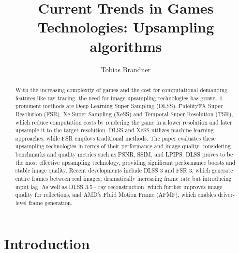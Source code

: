 \documentclass[letterpaper, 10 pt, conference]{ieeeconf}  %
\title{\LARGE \bf
Current Trends in Games Technologies: Upsampling algorithms
}
\author{Tobias Brandner}
\affil{Julius-Maximilians University \\
        Würzburg, Germany \\
        tobias.brandner@stud-mail.uni-wuerzburg.de}
\begin{document}
\maketitle
\thispagestyle{empty}
\pagestyle{empty}

\BiblatexSplitbibDefernumbersWarningOff

\begin{abstract}

With the increasing complexity of games and the cost for computational demanding features like ray tracing, the need for image upsampling technologies has grown. 
4 prominent methods are Deep Learning Super Sampling (DLSS), FidelityFX Super Resolution (FSR), Xe Super Sampling (XeSS) and Temporal Super Resolution (TSR), which reduce computation costs by rendering the game in a lower resolution and later upsample it to the target resolution. 
DLSS and XeSS utilizes machine learning approaches, while FSR employs traditional methods. 
The paper evaluates these upsampling technologies in terms of their performance and image quality, considering benchmarks and quality metrics such as PSNR, SSIM, and LPIPS. 
DLSS proves to be the most effective upsampling technology, providing significant performance boosts and stable image quality. 
Recent developments include DLSS 3 and FSR 3, which generate entire frames between real images, dramatically increasing frame rate but introducing input lag.
As well as DLSS 3.5 - ray reconstruction, which further improves image quality for reflections, and AMD's Fluid Motion Frame (AFMF), which enables driver-level frame generation.

\end{abstract}


\section{Introduction}
\end{document}
